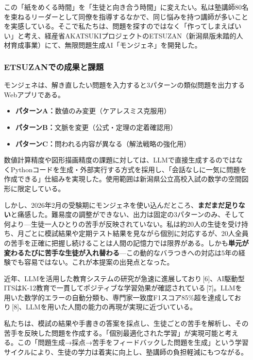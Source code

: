 \documentclass[paper=a4,fontsize=10.5bp,jafontsize=10.5bp,twocolumn]{jlreq}
\begin{document}
この「紙をめくる時間」を「生徒と向き合う時間」に変えたい。私は塾講師80名を束ねるリーダーとして同僚を指導するなかで、同じ悩みを持つ講師が多いことを実感している。そこで私たちは、問題を探すのではなく「作ってしまえばいい」と考え、経産省AKATSUKIプロジェクトのETSUZAN（新潟県版未踏的人材育成事業）にて、無限問題生成AI「モンジェネ」を開発した。

\subsubsection{ETSUZANでの成果と課題}

モンジェネは、解き直したい問題を入力すると3パターンの類似問題を出力するWebアプリである。

\begin{itemize}
  \item \textbf{パターンA：}数値のみ変更（ケアレスミス克服用）
  \item \textbf{パターンB：}文脈を変更（公式・定理の定着確認用）
  \item \textbf{パターンC：}問われる内容が異なる（解法戦略の強化用）
\end{itemize}

数値計算精度や図形描画精度の課題に対しては、LLMで直接生成するのではなくPythonコードを生成・外部実行する方式を採用し、「会話なしに一気に問題を作成できる」仕組みを実現した。使用範囲は新潟県公立高校入試の数学の空間図形に限定している。

しかし、2026年2月の受験期にモンジェネを使い込んだところ、\textbf{まだまだ足りない}と痛感した。難易度の調整ができない、出力は固定の3パターンのみ、そして何より---生徒一人ひとりの苦手が反映されていない。私は約20人の生徒を受け持ち、月ごとに模試結果や定期テスト結果を見ながら個別に対応するが、20人全員の苦手を正確に把握し続けることは人間の記憶力では限界がある。しかも\textbf{単元が変わるたびに苦手な生徒が入れ替わる}---この動的なバラつきへの対応は5年の経験でも容易ではない。これが本提案の出発点となった。

近年、LLMを活用した教育システムの研究が急速に進展しており\,[6]、AI駆動型ITSはK-12教育で一貫してポジティブな学習効果が確認されている\,[7]。LLMを用いた数学的エラーの自動分類も、専門家一致度F1スコア85\%超を達成しており\,[8]、LLMを用いた人間の能力の再現が実現に近づいている。

私たちは、模試の結果や手書きの答案を採点し、生徒ごとの苦手を解析し、その苦手を反映した問題を作成する。「個別最適化された学習」が実現可能と考える。この「問題生成→採点→苦手をフィードバックした問題を生成」という学習サイクルにより、生徒の学力は着実に向上し、塾講師の負担軽減にもつながる。
\end{document}
